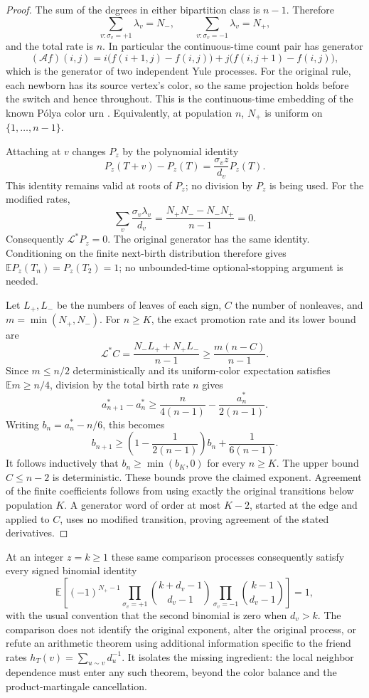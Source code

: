 \begin{proof}
The sum of the degrees in either bipartition class is $n-1$.  Therefore
\[
 \sum_{v:\sigma_v=+1}\lambda_v=N_-,\qquad
 \sum_{v:\sigma_v=-1}\lambda_v=N_+,
\]
and the total rate is $n$.  In particular the continuous-time count pair
has generator
\[
 (\mathcal Af)(i,j)
 =i\bigl(f(i+1,j)-f(i,j)\bigr)
  +j\bigl(f(i,j+1)-f(i,j)\bigr),
\]
which is the generator of two independent Yule processes. For the
original rule, each newborn has its source vertex's color, so
the same projection holds before the switch and hence throughout.
This is the continuous-time embedding of the known P\'olya color urn
\cite[Theorem 3.1]{CanningsJordan}.
Equivalently, at population $n$, $N_+$ is uniform on
$\{1,\ldots,n-1\}$.

Attaching at $v$ changes $P_z$ by the polynomial identity
\[
 P_z(T+v)-P_z(T)=\frac{\sigma_vz}{d_v}P_z(T).
\]
This identity remains valid at roots of $P_z$; no division by $P_z$ is
being used.  For the modified rates,
\[
 \sum_v\frac{\sigma_v\lambda_v}{d_v}
 =\frac{N_+N_--N_-N_+}{n-1}=0.
\]
Consequently $\mathcal L^*P_z=0$.  The original generator has the same
identity.  Conditioning on the finite next-birth distribution therefore
gives $\mathbb E P_z(T_n)=P_z(T_2)=1$; no unbounded-time optional-stopping
argument is needed.

Let $L_+,L_-$ be the numbers of leaves of each sign, $C$ the number of
nonleaves, and $m=\min(N_+,N_-)$.  For $n\geq K$, the exact promotion
rate and its lower bound are
\[
 \mathcal L^*C
 =\frac{N_-L_++N_+L_-}{n-1}
 \geq\frac{m(n-C)}{n-1}.
\]
Since $m\leq n/2$ deterministically and its uniform-color expectation
satisfies $\mathbb E m\geq n/4$, division by the total birth rate $n$
gives
\[
 a_{n+1}^*-a_n^*
 \geq\frac{n}{4(n-1)}-\frac{a_n^*}{2(n-1)}.
\]
Writing $b_n=a_n^*-n/6$, this becomes
\[
 b_{n+1}\geq
 \left(1-\frac1{2(n-1)}\right)b_n+\frac1{6(n-1)}.
\]
It follows inductively that $b_n\geq\min(b_K,0)$ for every $n\geq K$.
The upper bound $C\leq n-2$ is deterministic.  These bounds prove the
claimed exponent.  Agreement of the finite coefficients follows from
using exactly the original transitions below population $K$.  A generator
word of order at most $K-2$, started at the edge and applied to $C$, uses
no modified transition, proving agreement of the stated derivatives.
\end{proof}

At an integer $z=k\geq1$ these same comparison processes consequently
satisfy every signed binomial identity
\[
 \mathbb E\left[
 (-1)^{N_+-1}
 \prod_{\sigma_v=+1}\binom{k+d_v-1}{d_v-1}
 \prod_{\sigma_v=-1}\binom{k-1}{d_v-1}
 \right]=1,
\]
with the usual convention that the second binomial is zero when
$d_v>k$.  The comparison does not identify the original exponent, alter
the original process, or refute an arithmetic theorem using additional
information specific to the friend rates
$h_T(v)=\sum_{u\sim v}d_u^{-1}$.  It isolates the missing ingredient:
the local neighbor dependence must enter any such theorem, beyond the
color balance and the product-martingale cancellation.
